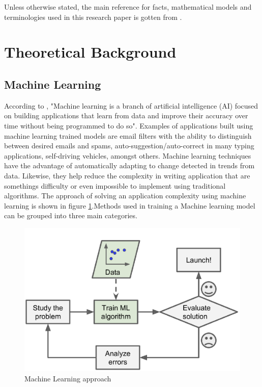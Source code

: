 \documentclass[conference]{IEEEtran}
\begin{document}
Unless otherwise stated, the main reference for facts, mathematical models and terminologies used in this research paper is gotten from \cite{massaron2016regression}.
\section{Theoretical Background}
\subsection{Machine Learning}
According to \cite{ibm_cloud_education_2020}, "Machine learning is a branch of artificial intelligence (AI) focused on building applications that learn from data and improve their accuracy over time without being programmed to do so". Examples of applications built using machine learning trained models are email filters with the ability to distinguish between desired emails and spams, auto-suggestion/auto-correct in many typing applications, self-driving vehicles, amongst others. Machine learning techniques have the advantage of automatically adapting to change detected in trends from data. Likewise, they help reduce the complexity in writing application that are somethings difficulty or even impossible to implement using traditional algorithms. The approach of solving an application complexity using machine learning is shown in figure \ref{fig:machine_approach}.Methods used in training a Machine learning model can be grouped into three main categories.

\newpage
\begin{figure}[htbp]
	\centerline{\includegraphics [scale=0.32]{figures/machine_approach.png}}
	\caption{Machine Learning approach \cite{geron2019hands}}
	\label{fig:machine_approach}
\end{figure}
\end{document}
